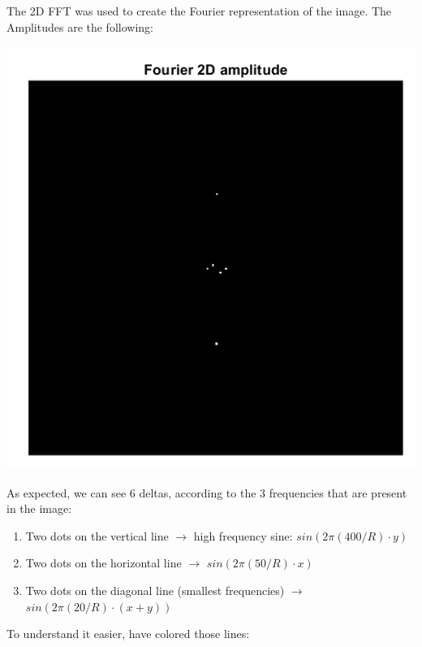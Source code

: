 \documentclass[a4paper]{iacas}
\begin{document}
\subsection{}
The 2D FFT was used to create the Fourier representation of the image. The Amplitudes are the following:

\vskip 0.1in
\begin{minipage}{0.5\textwidth}
	\centering
	\includegraphics[scale=0.7]{imgs/q1_2.png}
\end{minipage}
\vskip 0.1in

As expected, we can see 6 deltas, according to the 3 frequencies that are present in the image:

\begin{enumerate}
\item Two dots on the vertical line $\rightarrow$ high frequency sine: $sin(2\pi(400/R)\cdot y)$
\item Two dots on the horizontal line $\rightarrow$ $sin(2\pi(50/R)\cdot x)$
\item Two dots on the diagonal line (smallest frequencies) $\rightarrow$ $sin(2\pi(20/R)\cdot (x+y))$
\end{enumerate}

To understand it easier, have colored those lines:
\end{document}
